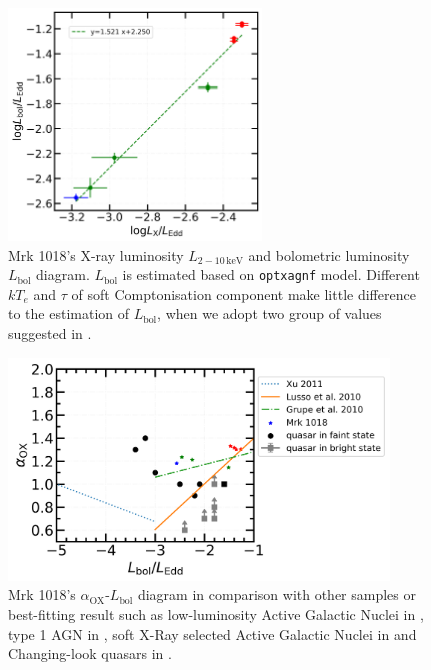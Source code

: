 \documentclass[twocolumn]{aastex63}
\begin{document}
\begin{figure}
\centering
	\includegraphics[width=0.6\textwidth]{./pic/Mrk1018_LxvsLBol_fit.png}
    \caption{Mrk 1018's X-ray luminosity $L_\mathrm{2-10\,keV}$ and bolometric luminosity $L_\mathrm{bol}$ diagram. $L_\mathrm{bol}$ is estimated based on \texttt{optxagnf} model. Different $kT_e$ and $\tau$ of soft Comptonisation component make little difference to the estimation of $L_\mathrm{bol}$, when we adopt two group of values suggested in \citet{2018MNRAS.480.3898N}.}
    \label{fig:xray-bol}
\end{figure}



\begin{figure}
\centering
	\includegraphics[width=0.9\textwidth]{./pic/Mrk1018_subplots_plus_alpha_ox_logLbol_rate.png}
    \caption{Mrk 1018's $\alpha_\mathrm{OX}$-$L_\mathrm{bol}$ diagram in comparison with other samples or best-fitting result such as low-luminosity Active Galactic Nuclei in \citet[][]{2011ApJ...739...64X}, type 1 AGN in \citet{2010A&A...512A..34L}, soft X-Ray selected Active Galactic Nuclei in \citet[][]{2010ApJS..187...64G} and Changing-look quasars in \citet[][]{2019ApJ...883...76R}. }
    \label{fig:alphaox-bol}
\end{figure}
\end{document}
